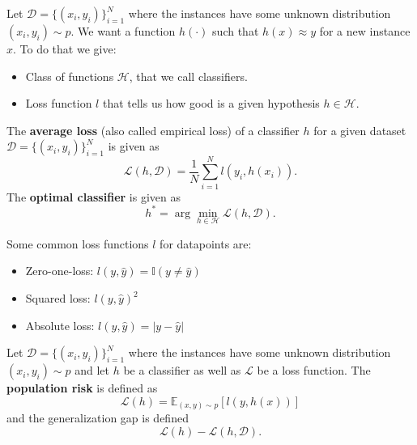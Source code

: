 Let $ \mathcal{ D } = \{ ( x_i , y_i ) \}_{ i = 1 }^N $ where the instances have some unknown distribution $ ( x_i , y_i ) \sim p $.
We want a function $ h ( \cdot ) $ such that $ h ( x ) \approx y $ for a new instance $ x $.
To do that we give:
\begin{itemize}
    \item 
    Class of functions $ \mathcal{ H } $, that we call classifiers.

    \item 
    Loss function $ l $ that tells us how good is a given hypothesis $ h \in \mathcal{ H } $.
\end{itemize}

\begin{defi}
    The \textbf{average loss} (also called empirical loss) of a classifier $ h $ for a given dataset $\mathcal{ D } = \{ ( x_i , y_i ) \}_{ i = 1 }^N $ is given as 
    \[
        \mathcal{ L } ( h , \mathcal{ D } )
        =
        \frac{ 1 }{ N } \sum_{ i = 1 }^N l ( y_i , h ( x_i ) ).
    \]
    The \textbf{optimal classifier} is given as
    \[
        h^* = \arg \min_{ h \in \mathcal{ H } } \mathcal{ L } ( h , \mathcal{ D } ).
    \]
\end{defi}

\begin{rmk}
    Some common loss functions $ l $ for datapoints are:
    \begin{itemize}
        \item 
        Zero-one-loss: $ l ( y , \widehat{ y } ) = \mathbb{ I } ( y \neq \widehat{ y } ) $

        \item 
        Squared loss: $ l ( y , \widehat{ y } )^2 $

        \item 
        Absolute loss: $ l ( y , \widehat{ y } ) = \lvert y - \widehat{ y } \rvert $
    \end{itemize}
\end{rmk}

\begin{defi}
    Let $ \mathcal{ D } = \{ ( x_i , y_i ) \}_{ i = 1 }^N $ where the instances have some unknown distribution $ ( x_i , y_i ) \sim p $ and let $ h $ be a classifier as well as $ \mathcal{ L } $ be a loss function.
    The \textbf{population risk} is defined as 
    \[
        \mathcal{ L } ( h ) 
        =
        \mathbb{ E }_{ ( x , y ) \sim p }[ l ( y , h ( x ) ) ]
    \]
    and the generalization gap is defined
    \[
        \mathcal{ L } ( h ) - \mathcal{ L } ( h , \mathcal{ D } ).
    \]
\end{defi}

